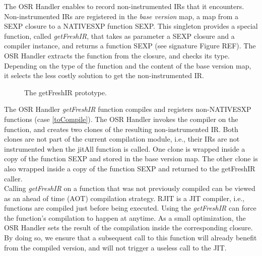 The OSR Handler enables to record non-instrumented IRs that it encounters.
Non-instrumented IRs are registered in the \textit{base version} map, a map from a SEXP closure to a NATIVESXP function SEXP.
This singleton provides a special function, called \textit{getFreshIR}, that takes as parameter a SEXP closure and a compiler instance, and returns a function SEXP (see signature Figure REF).
The OSR Handler extracts the function from the closure, and checks its type.
Depending on the type of the function and the content of the base version map, it selects the less costly solution to get the non-instrumented IR.\\

\begin{figure}[h]
\caption{The getFreshIR prototype.}
\label{fig:getfreshir}
\end{figure}

The OSR Handler \textit{getFreshIR} function compiles and registers non-NATIVESXP functions (case \ref{toCompile}).
The OSR Handler invokes the compiler on the function, and creates two clones of the resulting non-instrumented IR.
Both clones are not part of the current compilation module, i.e., their IRs are not instrumented when the jitAll function is called.
One clone is wrapped inside a copy of the function SEXP and stored in the base version map.
The other clone is also wrapped inside a copy of the function SEXP and returned to the getFreshIR caller.\\

Calling \textit{getFreshIR} on a function that was not previously compiled can be viewed as an ahead of time (AOT) compilation strategy.
RJIT is a JIT compiler, i.e., functions are compiled just before being executed.
Using the \textit{getFreshIR} can force the function's compilation to happen at anytime.
As a small optimization, the OSR Handler sets the result of the compilation inside the corresponding closure.
By doing so, we ensure that a subsequent call to this function will already benefit from the compiled version, and will not trigger a useless call to the JIT.\\

